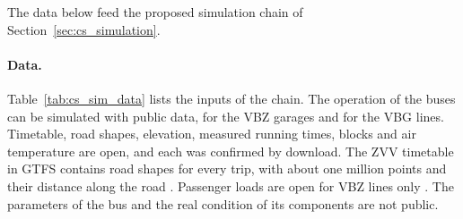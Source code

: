 \documentclass[11pt,a4paper]{article}
\theoremstyle{plain}
\theoremstyle{definition}
\theoremstyle{remark}
\begin{document}
The data below feed the proposed simulation chain of Section~\ref{sec:cs_simulation}.
\paragraph{Data.}
Table~\ref{tab:cs_sim_data} lists the inputs of the chain.
The operation of the buses can be simulated with public data, for the VBZ garages and for the VBG lines.
Timetable, road shapes, elevation, measured running times, blocks and air temperature are open, and each was confirmed by download.
The ZVV timetable in GTFS contains road shapes for every trip, with about one million points and their distance along the road \cite{ZVV2026GTFS}.
Passenger loads are open for VBZ lines only \cite{VBZFahrgast2025}.
The parameters of the bus and the real condition of its components are not public.
\end{document}
